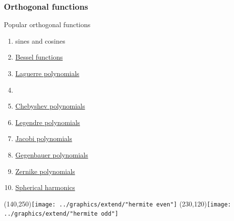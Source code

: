 \documentclass[handout]{beamer}
\begin{document}
\begin{frame}      %
\frametitle{Orthogonal functions}
  Popular orthogonal functions
  \begin{enumerate}
    \item sines and cosines
    \item \href{http://mathworld.wolfram.com/BesselFunction.html}{Bessel functions}
    \item \href{http://mathworld.wolfram.com/LaguerrePolynomial.html}{Laguerre polynomials}
    \item \href{http://mathworld.wolfram.com/HermitePolynomial.html}{}
    \item \href{http://mathworld.wolfram.com/ChebyshevPolynomialoftheFirstKind.html}{Chebyshev polynomials}
    \item \href{http://mathworld.wolfram.com/LegendrePolynomial.html}{Legendre polynomials}
    \item \href{http://mathworld.wolfram.com/JacobiPolynomial.html}{Jacobi polynomials}
    \item \href{http://mathworld.wolfram.com/GegenbauerPolynomial.html}{Gegenbauer polynomials}
    \item \href{http://mathworld.wolfram.com/ZernikePolynomial.html}{Zernike polynomials}
    \item \href{http://mathworld.wolfram.com/SphericalHarmonic.html}{Spherical harmonics}
  \end{enumerate}
    \Put(140,250){\texttt{[image: ../graphics/extend/"hermite even"]}}
    \Put(230,120){\texttt{[image: ../graphics/extend/"hermite odd"]}}
\end{frame}
\end{document}
